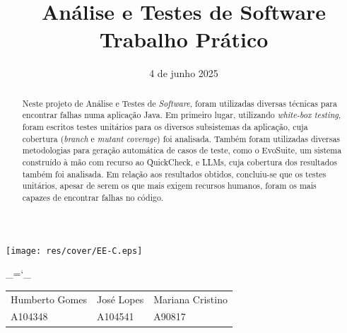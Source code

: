 \documentclass[12pt, a4paper]{article}
\title{\Huge \textbf{Análise e Testes de Software \\ \Large Trabalho Prático}}
\date{4 de junho 2025}
\begin{document}
\begin{center}
    \texttt{[image: res/cover/EE-C.eps]}
\end{center}

\chardef\_=`_
\onehalfspacing
\setlength{\parskip}{\baselineskip}
\setlength{\parindent}{0pt}
\def\arraystretch{1.5}

{\let\newpage\relax\maketitle}
\maketitle
\thispagestyle{empty}

\vspace{\fill}

\begin{adjustwidth}{-2cm}{-2cm} %
    \begin{center}
        \begin{tabular}{>{\centering}p{}
                        >{\centering}p{}
                        >{\centering\arraybackslash}p{}}

            Humberto Gomes & José Lopes & Mariana Cristino \\
            A104348        & A104541    & A90817
        \end{tabular}
    \end{center}
\end{adjustwidth}

\pagebreak

\begin{abstract}
    Neste projeto de Análise e Testes de \emph{Software}, foram utilizadas diversas técnicas para
    encontrar falhas numa aplicação Java. Em primeiro lugar, utilizando \emph{white-box testing},
    foram escritos testes unitários para os diversos subsistemas da aplicação, cuja cobertura
    (\emph{branch} e \emph{mutant coverage}) foi analisada. Também foram utilizadas diversas
    metodologias para geração automática de casos de teste, como o EvoSuite, um sistema construído à
    mão com recurso ao QuickCheck, e LLMs, cuja cobertura dos resultados também foi analisada. Em
    relação aos resultados obtidos, concluiu-se que os testes unitários, apesar de serem os que
    mais exigem recursos humanos, foram os mais capazes de encontrar falhas no código.
\end{abstract}
\end{document}
